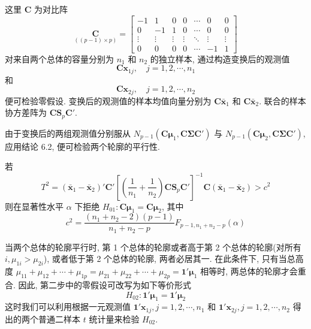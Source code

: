 这里 $\mathbf{C}$ 为对比阵
\label{eq:6-72}
\begin{equation}
\underset{((p-1)\times p)}{\mathbf{C}}=
\begin{bmatrix}
-1&1&0&0&\cdots&0&0\\
0&-1&1&0&\cdots&0&0\\
\vdots&\vdots&\vdots&\vdots&\ddots&\vdots&\vdots\\
0&0&0&0&\cdots&-1&1
\end{bmatrix}
\tag{6-72}
\end{equation}
对来自两个总体的容量分别为 $n_1$ 和 $n_2$ 的独立样本, 通过构造变换后的观测值
\[
\mathbf{C}\mathbf{x}_{1j}, \quad j=1,2,\cdots,n_1
\]
和
\[
\mathbf{C}\mathbf{x}_{2j}, \quad j=1,2,\cdots,n_2
\]
便可检验零假设. 变换后的观测值的样本均值向量分别为 $\mathbf{C}\bar{\mathbf{x}}_1$ 和 $\mathbf{C}\bar{\mathbf{x}}_2$. 联合的样本协方差阵为 $\mathbf{C}\mathbf{S}_p\mathbf{C}'$.

由于变换后的两组观测值分别服从 $N_{p-1}(\mathbf{C}\boldsymbol{\mu}_1,\mathbf{C}\boldsymbol{\Sigma}\mathbf{C}')$ 与 $N_{p-1}(\mathbf{C}\boldsymbol{\mu}_2,\mathbf{C}\boldsymbol{\Sigma}\mathbf{C}')$, 应用结论 6.2, 便可检验两个轮廓的平行性.

\begin{mvframe}

若
\label{eq:6-73}
\begin{equation}
T^2=(\bar{\mathbf{x}}_1-\bar{\mathbf{x}}_2)'\mathbf{C}'\left[\left(\frac{1}{n_1}+\frac{1}{n_2}\right)\mathbf{C}\mathbf{S}_p\mathbf{C}'\right]^{-1}\mathbf{C}(\bar{\mathbf{x}}_1-\bar{\mathbf{x}}_2)>c^2 \tag{6-73}
\end{equation}
则在显著性水平 $\alpha$ 下拒绝 $H_{01}: \mathbf{C}\boldsymbol{\mu}_1=\mathbf{C}\boldsymbol{\mu}_2$, 其中
\[
c^2=\frac{(n_1+n_2-2)(p-1)}{n_1+n_2-p}F_{p-1,n_1+n_2-p}(\alpha)
\]
\end{mvframe}

当两个总体的轮廓平行时, 第 1 个总体的轮廓或者高于第 2 个总体的轮廓(对所有 $i, \mu_{1i}>\mu_{2i}$), 或者低于第 2 个总体的轮廓, 两者必居其一. 在此条件下, 只有当总高度 $\mu_{11}+\mu_{12}+\cdots+\mu_{1p}=\mu_{21}+\mu_{22}+\cdots+\mu_{2p}=\mathbf{1}'\boldsymbol{\mu}_1$ 相等时, 两总体的轮廓才会重合. 因此, 第二步中的零假设可改写为如下等价形式
\[
H_{02}: \mathbf{1}'\boldsymbol{\mu}_1=\mathbf{1}'\boldsymbol{\mu}_2
\]
这时我们可以利用根据一元观测值 $\mathbf{1}'\mathbf{x}_{1j}, j=1,2,\cdots,n_1$ 和 $\mathbf{1}'\mathbf{x}_{2j}, j=1,2,\cdots,n_2$ 得出的两个普通二样本 $t$ 统计量来检验 $H_{02}$.

